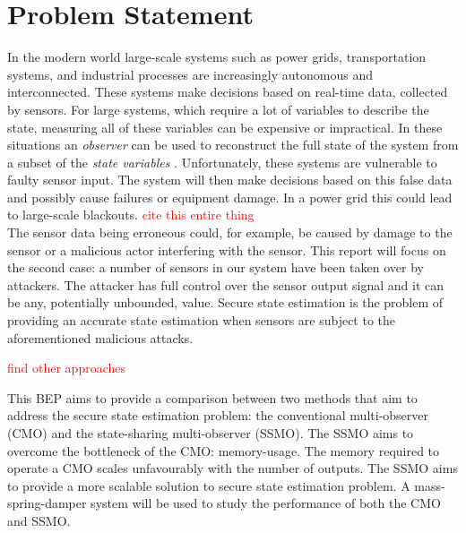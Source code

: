 \section{Problem Statement}
In the modern world large-scale systems such as power grids, transportation systems, and industrial processes are increasingly autonomous and interconnected. These systems make decisions based on real-time data, collected by sensors. For large systems, which require a lot of variables to describe the state, measuring all of these variables can be expensive or impractical. In these situations an \textit{observer} can be used to reconstruct the full state of the system from a subset of the \textit{state variables} \cite[Section 16.5]{Hespanha2018LinearTheory}. Unfortunately, these systems are vulnerable to faulty sensor input. The system will then make decisions based on this false data and possibly cause failures or equipment damage. In a power grid this could lead to large-scale blackouts. \textcolor{red}{cite this entire thing} \\

The sensor data being erroneous could, for example, be caused by damage to the sensor or a malicious actor interfering with the sensor. This report will focus on the second case: a number of sensors in our system have been taken over by attackers. The attacker has full control over the sensor output signal and it can be any, potentially unbounded, value. Secure state estimation is the problem of providing an accurate state estimation when sensors are subject to the aforementioned malicious attacks.


\textcolor{red}{find other approaches}


This BEP aims to provide a comparison between two methods that aim to address the secure state estimation problem: the conventional multi-observer (CMO)\cite{Chong2015ObservabilityAttacks} and the state-sharing multi-observer (SSMO)\cite{Chong2023MemoryAlgorithms}. The SSMO aims to overcome the bottleneck of the CMO: memory-usage. The memory required to operate a CMO scales unfavourably with the number of outputs. The SSMO aims to provide a more scalable solution to secure state estimation problem. A mass-spring-damper system will be used to study the performance of both the CMO and SSMO.




